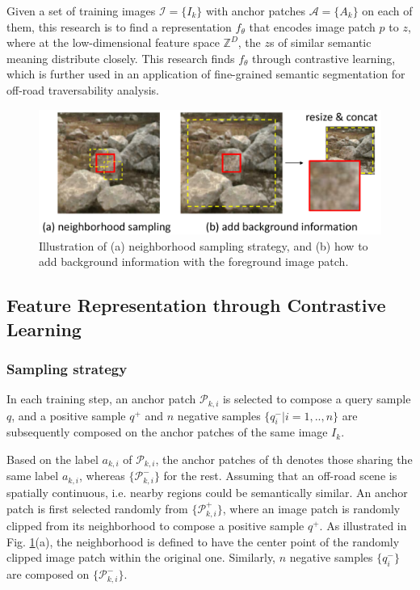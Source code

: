 \documentclass[letterpaper, 10 pt, conference]{ieeeconf}  %
\begin{document}
Given a set of training images $\mathcal{I}=\{I_k\}$ with anchor patches $\mathcal{A}=\{A_k\}$ on each of them, this research is to find a representation $f_{\theta}$ that encodes image patch $p$ to $z$, where at the low-dimensional feature space $\mathbb{Z}^D$, the $z$s of similar semantic meaning distribute closely. 
This research finds $f_{\theta}$ through contrastive learning, which is further used in an application of fine-grained semantic segmentation for off-road traversability analysis.

\begin{figure}[]
	\centering
	\includegraphics[scale=0.235]{dataaug.pdf}
	\caption{Illustration of (a) neighborhood sampling strategy, and (b) how to add background information with the foreground image patch.}
	\label{fig:dataaug}
\end{figure}

\subsection{Feature Representation through Contrastive Learning}

\subsubsection {Sampling strategy}

In each training step, an anchor patch $\mathcal{P}_{k,i}$ is selected to compose a query sample $q$, and a positive sample $q^+$ and $n$ negative samples $\{q^-_i|i=1,..,n\}$ are subsequently composed on the anchor patches of the same image $I_k$.

Based on the label $a_{k,i}$ of $\mathcal{P}_{k,i}$, the anchor patches of th denotes those sharing the same label $a_{k,i}$, whereas $\{\mathcal{P}_{k,i}^-\}$ for the rest.
Assuming that an off-road scene is spatially continuous, i.e. nearby regions could be semantically similar.
An anchor patch is first selected randomly from $\{\mathcal{P}_{k,i}^+\}$, where an image patch is randomly clipped from its neighborhood to compose a positive sample $q^+$. As illustrated in Fig. \ref{fig:dataaug}(a), the neighborhood is defined to have the center point of the randomly clipped image patch within the original one. Similarly, $n$ negative samples $\{q^-_i\}$ are composed on $\{\mathcal{P}_{k,i}^-\}$.
\end{document}
